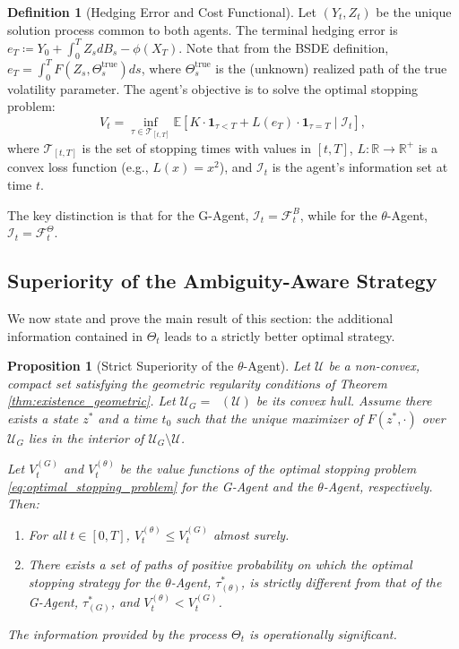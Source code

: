 \documentclass[12pt, letterpaper]{amsart}
\newcommand{\Ucal}{\mathcal{U}}
\newcommand{\R}{\mathbb{R}}
\DeclareMathOperator*{\overlineconv}{\overline{conv}}
\theoremstyle{plain}
\newtheorem{proposition}[theorem]{Proposition}
\theoremstyle{definition}
\newtheorem{definition}[theorem]{Definition}
\theoremstyle{remark}
\numberwithin{equation}{section} %
\begin{document}
\begin{definition}[Hedging Error and Cost Functional]
Let $(Y_t, Z_t)$ be the unique solution process common to both agents. The terminal hedging error is $e_T \coloneqq Y_0 + \int_0^T Z_s dB_s - \phi(X_T)$. Note that from the BSDE definition, $e_T = \int_0^T F(Z_s, \Theta_s^{\text{true}}) ds$, where $\Theta_s^{\text{true}}$ is the (unknown) realized path of the true volatility parameter. The agent's objective is to solve the optimal stopping problem:
\begin{equation}
\label{eq:optimal_stopping_problem}
    V_t = \inf_{\tau \in \mathcal{T}_{[t,T]}} \mathbb{E}\left[ K \cdot \mathbf{1}_{\tau < T} + L(e_T) \cdot \mathbf{1}_{\tau=T} \mid \mathcal{I}_t \right],
\end{equation}
where $\mathcal{T}_{[t,T]}$ is the set of stopping times with values in $[t,T]$, $L: \R \to \R^+$ is a convex loss function (e.g., $L(x)=x^2$), and $\mathcal{I}_t$ is the agent's information set at time $t$.
\end{definition}

The key distinction is that for the G-Agent, $\mathcal{I}_t = \mathcal{F}_t^B$, while for the $\theta$-Agent, $\mathcal{I}_t = \mathcal{F}_t^\Theta$.

\subsection{Superiority of the Ambiguity-Aware Strategy}
We now state and prove the main result of this section: the additional information contained in $\Theta_t$ leads to a strictly better optimal strategy.

\begin{proposition}[Strict Superiority of the $\theta$-Agent]
\label{prop:agent_superiority}
Let $\Ucal$ be a non-convex, compact set satisfying the geometric regularity conditions of Theorem \ref{thm:existence_geometric}. Let $\Ucal_G = \overlineconv(\Ucal)$ be its convex hull. Assume there exists a state $z^*$ and a time $t_0$ such that the unique maximizer of $F(z^*, \cdot)$ over $\Ucal_G$ lies in the interior of $\Ucal_G \setminus \Ucal$.

Let $V_t^{(G)}$ and $V_t^{(\theta)}$ be the value functions of the optimal stopping problem \eqref{eq:optimal_stopping_problem} for the G-Agent and the $\theta$-Agent, respectively. Then:
\begin{enumerate}[label=(\roman*)]
    \item For all $t \in [0,T]$, $V_t^{(\theta)} \le V_t^{(G)}$ almost surely.
    \item There exists a set of paths of positive probability on which the optimal stopping strategy for the $\theta$-Agent, $\tau^*_{(\theta)}$, is strictly different from that of the G-Agent, $\tau^*_{(G)}$, and $V_t^{(\theta)} < V_t^{(G)}$.
\end{enumerate}
The information provided by the process $\Theta_t$ is operationally significant.
\end{proposition}
\end{document}
